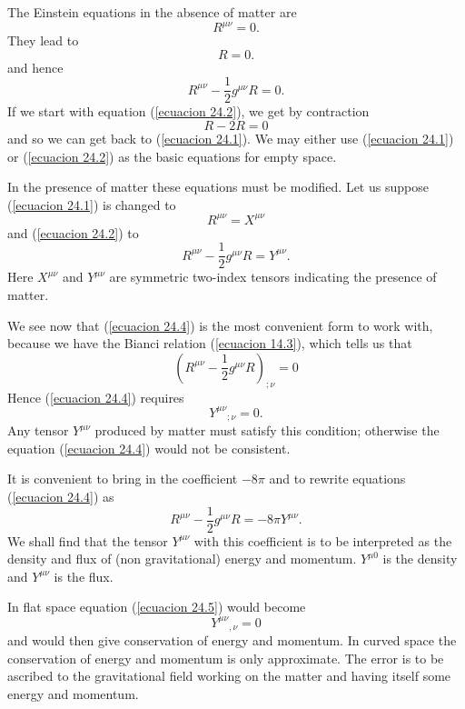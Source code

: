 The Einstein equations in the absence of matter are 
\begin{equation}
 \label{ecuacion 24.1}
 R^{\mu\nu} = 0 .
\end{equation}
They lead to 
\[
 R =  0.
\]
and hence
\begin{equation}
 \label{ecuacion 24.2}
 R^{\mu\nu} - \frac{1}{2}g^{\mu\nu} R = 0.
\end{equation}
If we start with equation (\ref{ecuacion 24.2}), we get by contraction
\[
R - 2 R = 0
\]
and so we can get back to (\ref{ecuacion 24.1}). We may either use (\ref{ecuacion 24.1}) or (\ref{ecuacion 24.2}) as 
the basic equations for empty space.

In the presence of matter these equations must be modified. Let us suppose (\ref{ecuacion 24.1}) is changed to 
\begin{equation}
 \label{ecuacion 24.3}
  R^{\mu\nu} = X^{\mu\nu} 
\end{equation}
and (\ref{ecuacion 24.2}) to
\begin{equation}
 \label{ecuacion 24.4}
  R^{\mu\nu} -\frac{1}{2} g^{\mu\nu} R = Y^{\mu\nu}.
\end{equation}
Here $X^{\mu\nu}$ and $Y^{\mu\nu}$ are symmetric two-index tensors indicating the presence of matter.

We see now that (\ref{ecuacion 24.4}) is the most convenient form to work with, because we have the Bianci relation 
(\ref{ecuacion 14.3}), which tells us that
\[
\left(R^{\mu\nu} - \frac{1}{2}g^{\mu\nu}  R \right)_{;\nu} = 0
\]
Hence (\ref{ecuacion 24.4}) requires
\begin{equation}
 \label{ecuacion 24.5}
 {Y^{\mu\nu}}_{;\nu} = 0.
\end{equation}
Any tensor $Y^{\mu\nu}$ produced by matter must satisfy this condition; otherwise the equation (\ref{ecuacion 24.4}) 
would not be consistent.

It is convenient to bring in the coefficient $-8\pi$ and to rewrite equations (\ref{ecuacion 24.4}) as
\begin{equation}
 \label{ecuacion 24.6}
  R^{\mu\nu} -\frac{1}{2} g^{\mu\nu} R = - 8 \pi Y^{\mu\nu}.
\end{equation}
We shall find that the tensor $Y^{\mu\nu}$ with this coefficient is to be interpreted as the density and flux of (non 
gravitational) energy and momentum. $Y^{\mu 0}$ is the density and $Y^{\mu\nu}$ is the flux.

In flat space equation (\ref{ecuacion 24.5}) would become
\[
{Y^{\mu\nu}}_{,\nu} = 0
\]
and would then give conservation of energy and momentum. In curved space the conservation of energy and momentum is 
only approximate. The error is to be ascribed to the gravitational field working on the matter and having itself some 
energy and momentum.
